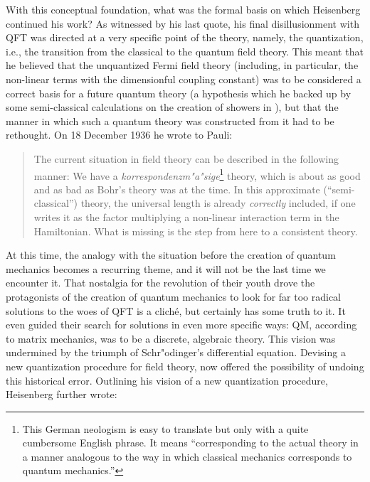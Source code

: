 \documentclass[12pt]{article}
\begin{document}
With this conceptual foundation, what was the formal basis on which Heisenberg continued his work? As witnessed by his last quote, his final disillusionment with QFT was directed at a very specific point of the theory, namely, the quantization, i.e., the transition from the classical to the quantum field theory. This meant that he believed that the unquantized Fermi field theory (including, in particular, the non-linear terms with the dimensionful coupling constant) was to be considered a correct basis for a future quantum theory (a hypothesis which he backed up by some semi-classical calculations on the creation of showers in \citep{heisenberg_1936_zur-theorie}), but that the manner in which such a quantum theory was constructed from it had to be rethought. On 18 December 1936 he wrote to Pauli:

\begin{quote}
The current situation in field theory can be described in the following manner: We have a \emph{korrespondenzm"a"sige}\footnote{This German neologism is easy to translate but only with a quite cumbersome English phrase. It means ``corresponding to the actual theory in a manner analogous to the way in which classical mechanics corresponds to quantum mechanics.''} theory, which is about as good and as bad as Bohr's theory was at the time. In this approximate (``semi-classical'') theory, the universal length is already \emph{correctly} included, if one writes it as the factor multiplying a non-linear interaction term in the Hamiltonian. What is missing is the step from here to a consistent theory.
\end{quote}

At this time, the analogy with the situation before the creation of quantum mechanics becomes a recurring theme, and it will not be the last time we encounter it. That nostalgia for the revolution of their youth drove the protagonists of the creation of quantum mechanics to look for far too radical solutions to the woes of QFT is a clich\'e, but certainly has some truth to it. It even guided their search for solutions in even more specific ways: QM, according to matrix mechanics, was to be a discrete, algebraic theory. This vision was undermined by the triumph of Schr"odinger's differential equation. Devising a new quantization procedure for field theory, now offered the possibility of undoing this historical error. Outlining his vision of a new quantization procedure, Heisenberg further wrote:
\end{document}

